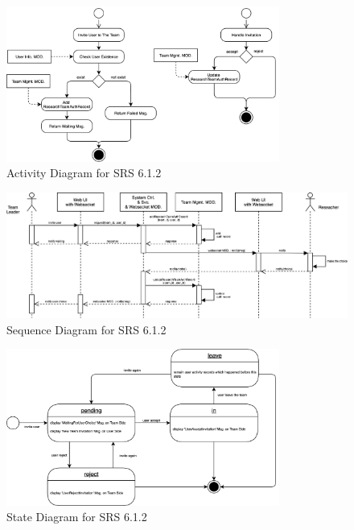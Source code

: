 \begin{figure}[t]
	\centering
	\includegraphics[width=0.8\textwidth]{./img/srs_diagram_6.png}
	\caption{Activity Diagram for SRS 6.1.2}
	
	\label{fig:srs_diagram_6}
\end{figure}

\begin{figure}[t]
	\centering
	\includegraphics[width=\textwidth]{./img/srs_diagram_7.png}
	\caption{Sequence Diagram for SRS 6.1.2}
	
	\label{fig:srs_diagram_7}
\end{figure}

\begin{figure}[t]
	\centering
	\includegraphics[width=0.8\textwidth]{./img/srs_diagram_8.png}
	\caption{State Diagram for SRS 6.1.2}
	
	\label{fig:srs_diagram_8}
\end{figure}
